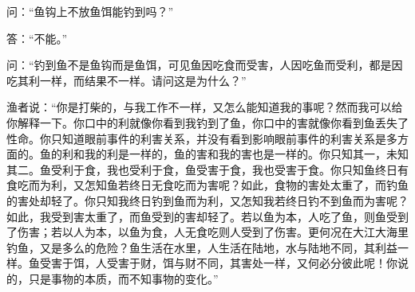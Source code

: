 \documentclass[12pt,UTF8]{ctexbook}
\begin{document}
问：“鱼钩上不放鱼饵能钓到吗？”

答：“不能。”

问：“钓到鱼不是鱼钩而是鱼饵，可见鱼因吃食而受害，人因吃鱼而受利，都是因吃其利一样，而结果不一样。请问这是为什么？”

渔者说：“你是打柴的，与我工作不一样，又怎么能知道我的事呢？然而我可以给你解释一下。你口中的利就像你看到我钓到了鱼，你口中的害就像你看到鱼丢失了性命。你只知道眼前事件的利害关系，并没有看到影响眼前事件的利害关系是多方面的。鱼的利和我的利是一样的，鱼的害和我的害也是一样的。你只知其一，未知其二。鱼受利于食，我也受利于食，鱼受害于食，我也受害于食。你只知鱼终日有食吃而为利，又怎知鱼若终日无食吃而为害呢？如此，食物的害处太重了，而钓鱼的害处却轻了。你只知我终日钓到鱼而为利，又怎知我若终日钓不到鱼而为害呢？如此，我受到害太重了，而鱼受到的害却轻了。若以鱼为本，人吃了鱼，则鱼受到了伤害；若以人为本，以鱼为食，人无食吃则人受到了伤害。更何况在大江大海里钓鱼，又是多么的危险？鱼生活在水里，人生活在陆地，水与陆地不同，其利益一样。鱼受害于饵，人受害于财，饵与财不同，其害处一样，又何必分彼此呢！你说的，只是事物的本质，而不知事物的变化。”
\end{document}
